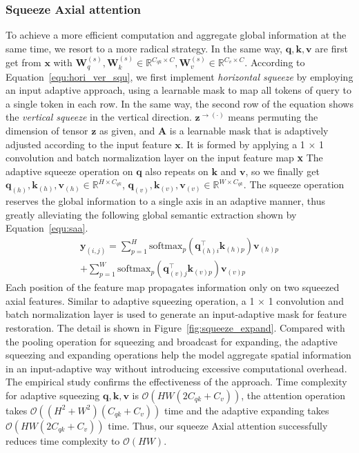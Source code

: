 \subsubsection{Squeeze Axial attention}
To achieve a more efficient computation and aggregate global information at the same time, we resort to a more radical strategy.
In the same way, $\mathbf{q},\mathbf{k},\mathbf{v}$ are first get from $\mathbf{x}$ with $\mathbf{W}_q^{(s)}, \mathbf{W}_k^{(s)}\in \mathbb{R}^{C_{qk}\times C}, \mathbf{W}_v^{(s)}\in \mathbb{R}^{C_v\times C}$.
According to Equation~\ref{equ:hori_ver_squ}, we first implement \textit{horizontal squeeze} by employing an input adaptive approach, using a learnable mask to map all tokens of query to a single token in each row.
In the same way, the second row of the equation shows the \textit{vertical squeeze} in the vertical direction.
$\mathbf{z}^{\rightarrow(\cdot)}$ means permuting the dimension of tensor $\mathbf{z}$ as given, and $\mathbf{A}$ is a learnable mask that is adaptively adjusted according to the input feature $\mathbf{x}$. It is formed by applying a 1 $\times$ 1 convolution and batch normalization layer on the input feature map \textbf{x}
The adaptive squeeze operation on $\mathbf{q}$ also repeats on $\mathbf{k}$ and $\mathbf{v}$, so we finally get $\mathbf{q}_{(h)}, \mathbf{k}_{(h)}, \mathbf{v}_{(h)}\in\mathbb{R}^{H\times C_{qk}}$, $\mathbf{q}_{(v)}, \mathbf{k}_{(v)}, \mathbf{v}_{(v)}\in\mathbb{R}^{W\times C_{qk}}$.
The squeeze operation reserves the global information to a single axis in an adaptive manner, thus greatly alleviating the following global semantic extraction shown by Equation~\ref{equ:saa}.
\begin{equation}
\begin{split}
\label{equ:saa}
    \mathbf{y}_{(i,j)} = \sum_{p=1}^{H}\text{softmax}_p\left( \mathbf{q}_{(h)i}^\top \mathbf{k}_{(h)p} \right)\mathbf{v}_{(h)p}\\
    + \sum_{p=1}^W\text{softmax}_p\left( \mathbf{q}_{(v)j}^\top \mathbf{k}_{(v)p} \right)\mathbf{v}_{(v)p}
\end{split}
\end{equation}
Each position of the feature map propagates information only on two squeezed axial features.
Similar to adaptive squeezing operation, a 1 $\times$ 1 convolution and batch normalization layer is used to generate an input-adaptive mask for feature restoration. The detail is shown in Figure~\ref{fig:squeeze_expand}. Compared with the pooling operation for squeezing and broadcast for expanding, the adaptive squeezing and expanding operations help the model aggregate spatial information in an input-adaptive way without introducing excessive computational overhead. The empirical study confirms the effectiveness of the approach.
Time complexity for adaptive squeezing $\mathbf{q},\mathbf{k},\mathbf{v}$ is $\mathcal{O}(HW(2C_{qk}+C_v))$, the attention operation takes $\mathcal{O}((H^2+W^2)(C_{qk}+C_v))$ time and the adaptive expanding takes $\mathcal{O}(HW(2C_{qk}+C_v))$ time.
Thus, our squeeze Axial attention successfully reduces time complexity to $\mathcal{O}(HW)$. 

